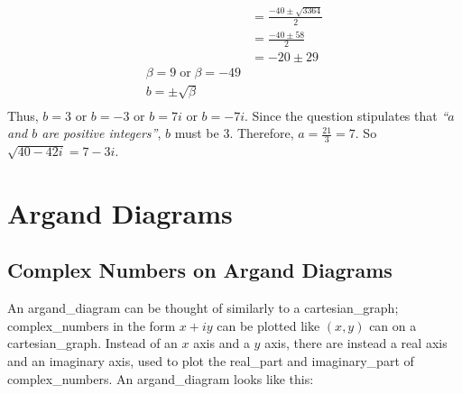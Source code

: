 {\begin{enumerate}
\begin{equation*}
\begin{aligned}
                        &=\frac{-40\pm\sqrt{3364}}{2} \\
                        &=\frac{-40\pm58}{2} \\
                        &=-20\pm29 \\
                        \beta=9\;\text{or}\;\beta=-49 \\
                        b=\pm\sqrt{\beta} \\
                    \end{aligned}
                \end{equation*}
                Thus, $b=3$ or $b=-3$ or $b=7i$ or $b=-7i$.
                Since the question stipulates that \textit{``$a$ and $b$ are positive integers''}, $b$ must be 3.
                Therefore, $a=\frac{21}{3}=7$.
                So $\sqrt{40-42i}=\boxed{7-3i}$.
            \end{enumerate}
        }

    \newpage

\section{Argand Diagrams} \label{argand_diagrams}
    \subsection{Complex Numbers on Argand Diagrams}
        An \gls{argand_diagram} can be thought of similarly to a \gls{cartesian_graph}; \glspl{complex_number} in the form $x+iy$ can be plotted like $(x, y)$ can on a \gls{cartesian_graph}.
        Instead of an $x$ axis and a $y$ axis, there are instead a real axis and an imaginary axis, used to plot the \gls{real_part} and \gls{imaginary_part} of \glspl{complex_number}.
        An \gls{argand_diagram} looks like this:

